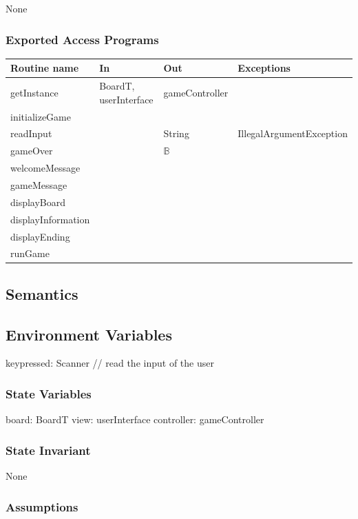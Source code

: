 \documentclass[12pt]{article}
\begin{document}
None

\subsubsection* {Exported Access Programs}

\begin{tabular}{| l | l | l | p{6cm} |}
\hline
\textbf{Routine name} & \textbf{In} & \textbf{Out} & \textbf{Exceptions}\\
\hline
getInstance & BoardT, userInterface & gameController &  \\
\hline
initializeGame &  &  & \\
\hline
readInput &  & String & IllegalArgumentException \\
\hline
gameOver &  & $\mathbb{B}$ & \\
\hline
welcomeMessage &  &  & \\
\hline
gameMessage &  &  & \\
\hline
displayBoard &  &  & \\
\hline
displayInformation &  &  & \\
\hline
displayEnding &  &  & \\
\hline
runGame &  &  & \\
\hline
\end{tabular}

\subsection* {Semantics}

\subsection*{Environment Variables}

keypressed: Scanner // read the input of the user

\subsubsection* {State Variables}

board: BoardT
view: userInterface
controller: gameController

\subsubsection* {State Invariant}

None

\subsubsection* {Assumptions}
\end{document}
